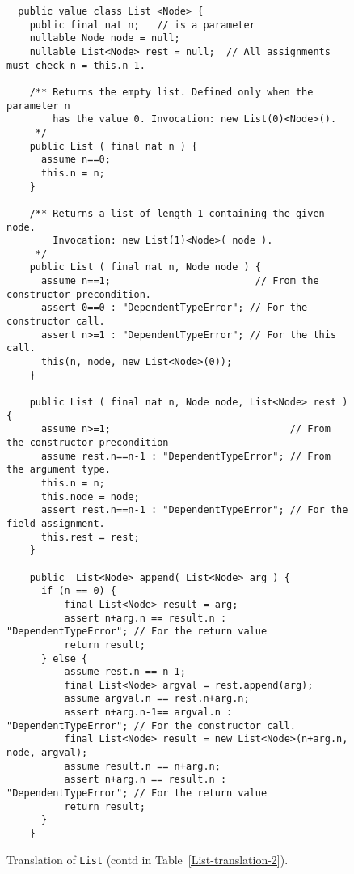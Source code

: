 \documentclass[nocopyrightspace,preprint,9pt]{sigplanconf}
\begin{document}
\begin{figure*}
{\footnotesize
\begin{verbatim}
  public value class List <Node> {
    public final nat n;   // is a parameter
    nullable Node node = null;
    nullable List<Node> rest = null;  // All assignments must check n = this.n-1.

    /** Returns the empty list. Defined only when the parameter n
        has the value 0. Invocation: new List(0)<Node>().
     */
    public List ( final nat n ) {
      assume n==0;
      this.n = n;
    }

    /** Returns a list of length 1 containing the given node.
        Invocation: new List(1)<Node>( node ).
     */
    public List ( final nat n, Node node ) {
      assume n==1;                         // From the constructor precondition.
      assert 0==0 : "DependentTypeError"; // For the constructor call.
      assert n>=1 : "DependentTypeError"; // For the this call.
      this(n, node, new List<Node>(0));
    }

    public List ( final nat n, Node node, List<Node> rest ) {
      assume n>=1;                               // From the constructor precondition
      assume rest.n==n-1 : "DependentTypeError"; // From the argument type.
      this.n = n;
      this.node = node;
      assert rest.n==n-1 : "DependentTypeError"; // For the field assignment.
      this.rest = rest;
    }

    public  List<Node> append( List<Node> arg ) {
      if (n == 0) {
          final List<Node> result = arg;
          assert n+arg.n == result.n : "DependentTypeError"; // For the return value
          return result;
      } else {
          assume rest.n == n-1;
          final List<Node> argval = rest.append(arg);
          assume argval.n == rest.n+arg.n;
          assert n+arg.n-1== argval.n : "DependentTypeError"; // For the constructor call.
          final List<Node> result = new List<Node>(n+arg.n, node, argval);
          assume result.n == n+arg.n;
          assert n+arg.n == result.n : "DependentTypeError"; // For the return value
          return result;
      }
    }

\end{verbatim}}
\caption{Translation of {\tt List} (contd in Table~\ref{List-translation-2}).}\label{List-translation}
\end{figure*}
\end{document}
